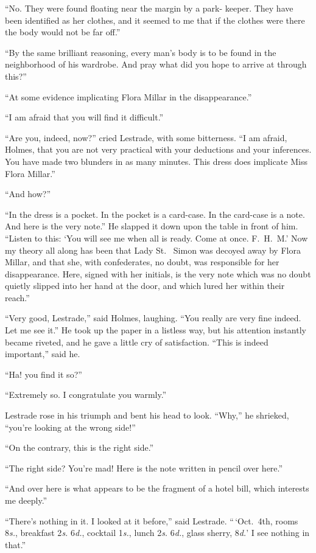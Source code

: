 “No. They were found floating near the margin by a park-%
keeper. They have been identified as her clothes, and it
seemed to me that if the clothes were there the body would
not be far off.”

“By the same brilliant reasoning, every man’s body is to be
found in the neighborhood of his wardrobe. And pray what
did you hope to arrive at through this?”

“At some evidence implicating Flora Millar in the
disappearance.”

“I am afraid that you will find it difficult.”

“Are you, indeed, now?” cried Lestrade, with some bitterness.
“I am afraid, Holmes, that you are not very practical
with your deductions and your inferences. You have made
two blunders in as many minutes. This dress does implicate
Miss Flora Millar.”

“And how?”

“In the dress is a pocket. In the pocket is a card-case.
In the card-case is a note. And here is the very note.” He
slapped it down upon the table in front of him. “Listen to
this: ‘You will see me when all is ready. Come at once.
F.\ H.\ M.’ Now my theory all along has been that Lady St.\ %
Simon was decoyed away by Flora Millar, and that she, with
confederates, no doubt, was responsible for her disappearance.
Here, signed with her initials, is the very note which was no
doubt quietly slipped into her hand at the door, and which
lured her within their reach.”

“Very good, Lestrade,” said Holmes, laughing. “You
really are very fine indeed. Let me see it.” He took up the
paper in a listless way, but his attention instantly became
riveted, and he gave a little cry of satisfaction. “This is indeed
important,” said he.

“Ha! you find it so?”

“Extremely so. I congratulate you warmly.”

Lestrade rose in his triumph and bent his head to look.
“Why,” he shrieked, “you’re looking at the wrong side!”

“On the contrary, this is the right side.”

“The right side? You’re mad! Here is the note written
in pencil over here.”

“And over here is what appears to be the fragment of a
hotel bill, which interests me deeply.”

“There’s nothing in it. I looked at it before,” said Lestrade.
“\,‘Oct.\ 4th, rooms 8\textit{s.}, breakfast 2\textit{s.} 6\textit{d.}, cocktail 1\textit{s.},
lunch 2\textit{s.} 6\textit{d.}, glass sherry, 8\textit{d.}’ I see nothing in that.”

